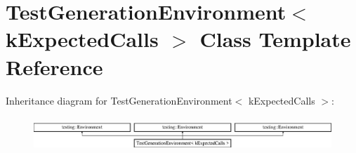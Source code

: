 \hypertarget{class_test_generation_environment}{}\section{Test\+Generation\+Environment$<$ k\+Expected\+Calls $>$ Class Template Reference}
\label{class_test_generation_environment}
Inheritance diagram for Test\+Generation\+Environment$<$ k\+Expected\+Calls $>$\+:\begin{figure}[H]
\begin{center}
\leavevmode
\includegraphics[height=1.309942cm]{d2/d66/class_test_generation_environment}
\end{center}
\end{figure}
